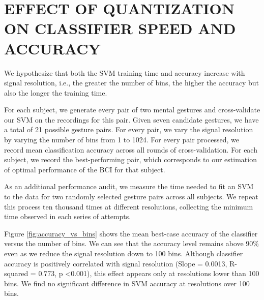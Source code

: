 \section{\uppercase{Effect of quantization on classifier speed and accuracy}}
\label{sec:quantization_eval}


We hypothesize that both the SVM training time and accuracy increase with signal resolution, i.e., the greater the number of bins, the higher the accuracy but also the longer the training time.



For each subject, we generate every pair of two mental gestures and cross-validate our SVM on the recordings for this pair. Given seven candidate gestures, we have a total of 21 possible gesture pairs. For every pair, we vary the signal resolution by varying the number of bins from 1 to 1024. For every pair processed, we record mean classification accuracy across all rounds of cross-validation. For each subject, we record the best-performing pair, which corresponds to our estimation of optimal performance of the BCI for that subject.

As an additional performance audit, we measure the time needed to fit an SVM to the data for two randomly selected gesture pairs across all subjects. We repeat this process ten thousand times at different resolutions, collecting the minimum time observed in each series of attempts.


Figure \ref{fig:accuracy_vs_bins} shows the mean best-case accuracy of the classifier versus the number of bins. We can see that the accuracy level remains above 90\% even as we reduce the signal resolution down to 100 bins. Although classifier accuracy is positively correlated with signal resolution (Slope = 0.0013, R-squared = 0.773, p \textless 0.001), this effect appears only at resolutions lower than 100 bins. We find no significant difference in SVM accuracy at resolutions over 100 bins.

